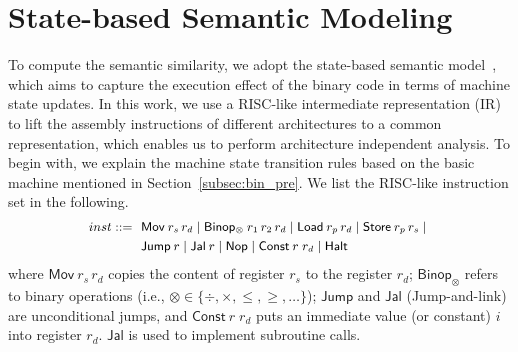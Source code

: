 \section{State-based Semantic Modeling} \label{subsec:stat_sem}
To compute the semantic similarity, we adopt the state-based semantic model~\cite{luo2014semantics,DBLP:conf/sp/PewnyGGRH15}, which aims to capture the execution effect of the binary code in terms of machine state updates.
In this work, we use a RISC-like intermediate representation (IR) to lift the assembly instructions of different architectures to a common representation, which enables us to perform architecture independent analysis.
To begin with, we explain the machine state transition rules based on the basic machine mentioned in Section~\ref{subsec:bin_pre}.
We list the RISC-like instruction set in the following. %
\begin{equation*}
\small
\begin{split}
inst ::= &~~\mathsf{Mov} \: r_s\, r_d\; \vert \; \mathsf{Binop_\otimes} \: r_1\, r_2\, r_d\; \vert \; \mathsf{Load} \: r_p\, r_d\; \vert \; \mathsf{Store} \: r_p\, r_s \; \vert \;\\
&~~ \mathsf{Jump} \: r \; \vert \; \mathsf{Jal} \: r \; \vert \; \mathsf{Nop} \; \vert \; \mathsf{Const} \: r \; r_d \; \vert \; \mathsf{Halt}
\end{split}
\end{equation*}
where $\mathsf{Mov} \: r_s\, r_d$ copies the content of register $r_s$ to the register $r_d$; $\mathsf{Binop_\otimes}$ refers to binary operations (i.e., $\otimes \in \lbrace \div, \times, \leq, \geq, \ldots\rbrace$);  $\mathsf{Jump}$ and $\mathsf{Jal}$ (Jump-and-link) are unconditional jumps, and $\mathsf{Const} \: r \; r_d$ puts an immediate value (or constant) $i$ into register $r_d$. $\mathsf{Jal}$ is used to implement subroutine calls.

